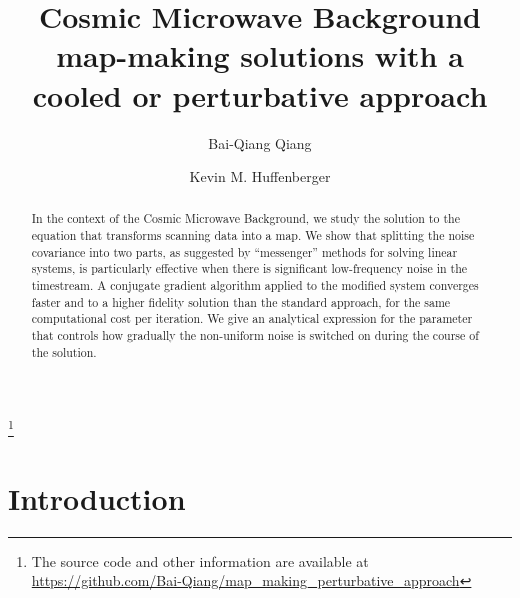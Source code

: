 \documentclass[twocolumn,linenumbers]{aastex631}
\newcommand{\kmh}[1]{\textcolor{red}{KMH: #1}}
\begin{document}
\title{Cosmic Microwave Background map-making solutions with a cooled or perturbative approach}

\footnote{
The source code and other information are available at \url{https://github.com/Bai-Qiang/map_making_perturbative_approach}
}

\author{Bai-Qiang Qiang}

\author[0000-0001-7109-0099]{Kevin M. Huffenberger}

 
\begin{abstract}

In the context of the Cosmic Microwave Background, we study the solution to the equation that transforms scanning data into a map.  We show that splitting the noise covariance into two parts, as suggested by ``messenger'' methods for solving linear systems, is particularly effective when there is significant low-frequency noise in the timestream.  A conjugate gradient algorithm applied to the modified system converges faster and to a higher fidelity solution than the standard approach, for the same computational cost per iteration.
%
We give an analytical expression for the parameter that controls how gradually the non-uniform noise is switched on during the course of the solution. 

\end{abstract}


\section{Introduction} \label{sec:intro}
\end{document}
